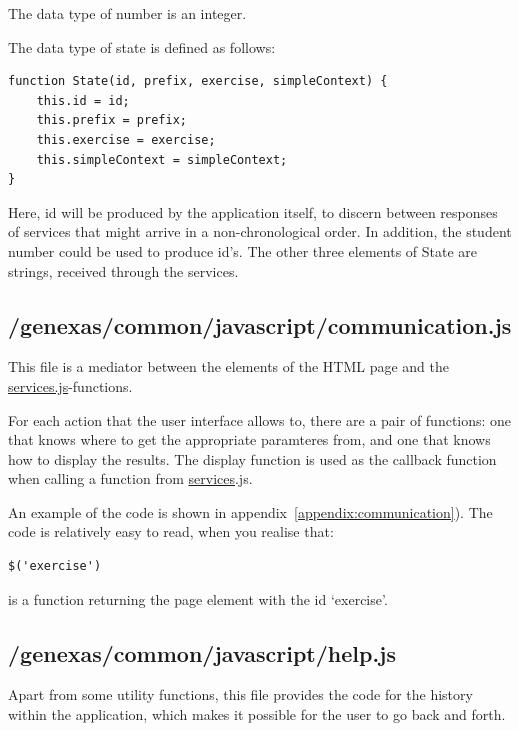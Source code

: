 \documentclass{article}
\begin{document}
The data type of number is an integer.

The data type of state is defined as follows:
\begin{verbatim}
function State(id, prefix, exercise, simpleContext) {
    this.id = id;
    this.prefix = prefix;
    this.exercise = exercise;
    this.simpleContext = simpleContext;
}
\end{verbatim}
Here, id will be produced by the application itself, to discern between responses of services that might arrive in a non-chronological order. In addition, the student number could be used to produce id's. The other three elements of State are strings, received through the services.


\subsection{/genexas/common/javascript/communication.js}
This file is a mediator between the elements of the HTML page and the \url{services.js}-functions. 

For each action that the user interface allows to, there are a pair of functions: one that knows where to get the appropriate paramteres from, and one that knows how to display the results. The display function is used as the callback function when calling a function from \url{services}.js.

An example of the code is shown in appendix~\ref{appendix:communication}). The code is relatively easy to read, when you realise that:
\begin{verbatim}
$('exercise')
\end{verbatim}
is a function returning the page element with the id `exercise'.

\subsection{/genexas/common/javascript/help.js}
Apart from some utility functions, this file provides the code for the history within the application, which makes it possible for the user to go back and forth.
\end{document}
